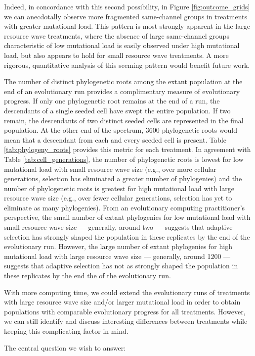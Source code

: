 

Indeed, in concordance with this second possibility, in Figure \ref{fig:outcome_grids} we can anecdotally observe more fragmented same-channel groups in treatments with greater mutational load.
This pattern is most strongly apparent in the large resource wave treatments, where the absence of large same-channel groups characteristic of low mutational load is easily observed under high mutational load, but also appears to hold for small resource wave treatments.
A more rigorous, quantitative analysis of this seeming pattern would benefit future work.



The number of distinct phylogenetic roots among the extant population at the end of an evolutionary run provides a complimentary measure of evolutionary progress.
If only one phylogenetic root remains at the end of a run, the descendants of a single seeded cell have swept the entire population.
If two remain, the descendants of two distinct seeded cells are represented in the final population.
At the other end of the spectrum, 3600 phylogenetic roots would mean that a descendant from each and every seeded cell is present.
Table \ref{tab:phylogeny_roots} provides this metric for each treatment.
In agreement with Table \ref{tab:cell_generations}, the number of phylogenetic roots is lowest for low mutational load with small resource wave size (e.g., over more cellular generations, selection has eliminated a greater number of phylogenies) and the number of phylogenetic roots is greatest for high mutational load with large resource wave size (e.g., over fewer cellular generations, selection has yet to eliminate as many phylogenies).
From an evolutionary computing practitioner's perspective, the small number of extant phylogenies for low mutational load with small resource wave size --- generally, around two --- suggests that adaptive selection has strongly shaped the population in these replicates by the end of the evolutionary run.
However, the large number of extant phylogenies for high mutational load with large resource wave size --- generally, around 1200 --- suggests that adaptive selection has not as strongly shaped the population in these replicates by the end the of the evolutionary run.

With more computing time, we could extend the evolutionary runs of treatments with large resource wave size and/or larger mutational load in order to obtain populations with comparable evolutionary progress for all treatments.
However, we can still identify and discuss interesting differences between treatments while keeping this complicating factor in mind.

The central question we wish to answer:
